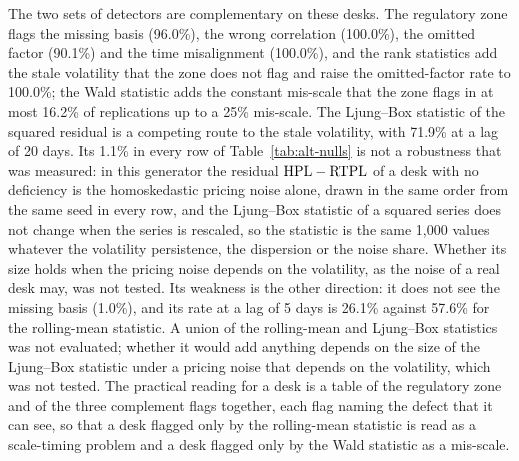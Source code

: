 The two sets of detectors are complementary on these desks.
The regulatory zone flags the missing basis (96.0\%), the wrong correlation (100.0\%), the omitted factor (90.1\%) and the time misalignment (100.0\%), and the rank statistics add the stale volatility that the zone does not flag and raise the omitted-factor rate to 100.0\%; the Wald statistic adds the constant mis-scale that the zone flags in at most 16.2\% of replications up to a 25\% mis-scale.
The Ljung--Box statistic of the squared residual is a competing route to the stale volatility, with 71.9\% at a lag of 20 days.
Its 1.1\% in every row of Table~\ref{tab:alt-nulls} is not a robustness that was measured: in this generator the residual $\mathrm{HPL}-\mathrm{RTPL}$ of a desk with no deficiency is the homoskedastic pricing noise alone, drawn in the same order from the same seed in every row, and the Ljung--Box statistic of a squared series does not change when the series is rescaled, so the statistic is the same 1,000 values whatever the volatility persistence, the dispersion or the noise share.
Whether its size holds when the pricing noise depends on the volatility, as the noise of a real desk may, was not tested.
Its weakness is the other direction: it does not see the missing basis (1.0\%), and its rate at a lag of 5 days is 26.1\% against 57.6\% for the rolling-mean statistic.
A union of the rolling-mean and Ljung--Box statistics was not evaluated; whether it would add anything depends on the size of the Ljung--Box statistic under a pricing noise that depends on the volatility, which was not tested.
The practical reading for a desk is a table of the regulatory zone and of the three complement flags together, each flag naming the defect that it can see, so that a desk flagged only by the rolling-mean statistic is read as a scale-timing problem and a desk flagged only by the Wald statistic as a mis-scale.
